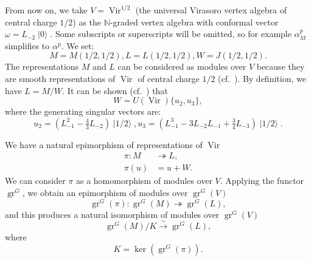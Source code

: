 \documentclass[a4paper, 12pt, reqno]{amsart}
\theoremstyle{remark}
\DeclareMathOperator{\Vir}{Vir}
\DeclareMathOperator{\gr}{gr}
\DeclareMathOperator{\vac}{|0\rangle}
\DeclareMathOperator{\vachalf}{|1/2\rangle}
\begin{document}
From now on, we take $V = \Vir^{1/2}$ (the universal Virasoro vertex algebra of central charge $1/2$) as the $\mathbb{N}$-graded vertex algebra with conformal vector $\omega = L_{-2}\vac$.
Some subscripts or superscripts will be omitted, so for example $\alpha^p_M$ simplifies to $\alpha^p$.
We set:
\begin{equation*}
  M = M(1/2, 1/2), L = L(1/2, 1/2), W = J(1/2, 1/2).
\end{equation*}
The representations $M$ and $L$ can be considered as modules over $V$ because they are smooth representations of $\Vir$ of central charge $1/2$ (cf.\ \cite[Theorem 6.1.7]{lepowsky_introduction_2004}).
By definition, we have $L = M/W$.
It can be shown (cf.\ \cite{astashkevich_structure_1997}) that
\begin{equation}
  \label{eq:3}
  W = U(\Vir)\{u_2, u_3\},
\end{equation}
where the generating singular vectors are:
\begin{equation}
  \label{eq:4}
  u_2 = (L_{-1}^2 - \tfrac{4}{3}L_{-2})\vachalf, u_3 = (L_{-1}^3 - 3L_{-2}L_{-1} + \tfrac{3}{4}L_{-3})\vachalf.
\end{equation}

We have a natural epimorphism of representations of $\Vir$
\begin{align*}
  \pi: M &\twoheadrightarrow L, \\
  \pi(u) &= u + W.
\end{align*}
We can consider $\pi$ as a homomorphism of modules over $V$.
Applying the functor $\gr^G$, we obtain an epimorphism of modules over $\gr^G(V)$
\begin{equation*}
  \gr^G(\pi): \gr^G(M) \twoheadrightarrow \gr^G(L),
\end{equation*}
and this produces a natural isomorphism of modules over $\gr^G(V)$
\begin{equation*}
  \gr^G(M)/K \xrightarrow{\sim} \gr^G(L),
\end{equation*}
where
\begin{equation}
  \label{eq:5}
  K = \ker(\gr^G(\pi)).
\end{equation}
\end{document}
